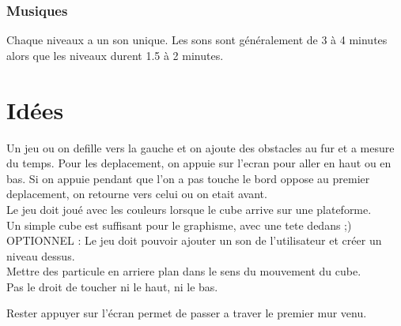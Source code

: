 \documentclass{article}
\begin{document}
\subsubsection{Musiques}
Chaque niveaux a un son unique. Les sons sont généralement de 3 à 4 minutes alors que les niveaux durent 1.5 à 2 minutes.

\section{Idées}
Un jeu ou on defille vers la gauche et on ajoute des obstacles au fur et a mesure du temps. Pour les deplacement, on appuie sur l'ecran pour aller en haut ou en bas. Si on appuie pendant que l'on a pas touche le bord oppose au premier deplacement, on retourne vers celui ou on etait avant.\\


Le jeu doit joué avec les couleurs lorsque le cube arrive sur une plateforme.\\

Un simple cube est suffisant pour le graphisme, avec une tete dedans ;)\\

OPTIONNEL : Le jeu doit pouvoir ajouter un son de l'utilisateur et créer un niveau dessus.\\

Mettre des particule en arriere plan dans le sens du mouvement du cube.\\

Pas le droit de toucher ni le haut, ni le bas.

Rester appuyer sur l'écran permet de passer a traver le premier mur venu.
\end{document}
